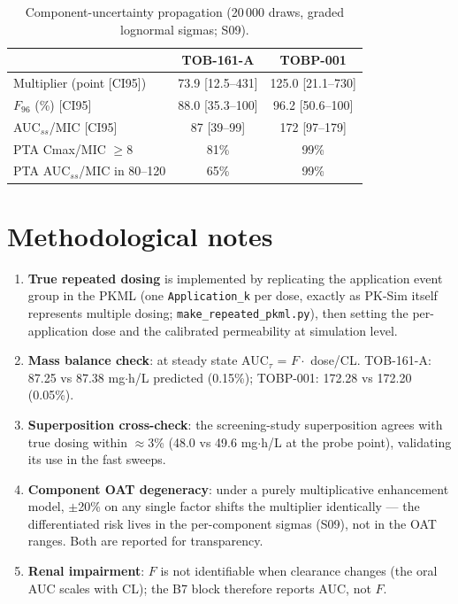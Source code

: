 \begin{table}[htbp]
\centering
\caption{Component-uncertainty propagation (20\,000 draws, graded lognormal sigmas; S09).}
\label{tab:app-s09}
\small
\begin{tabular}{lcc}
\toprule
 & TOB-161-A & TOBP-001 \\
\midrule
Multiplier (point [CI95])   & 73.9 [12.5--431] & 125.0 [21.1--730] \\
$F_{96}$ (\%) [CI95]        & 88.0 [35.3--100] & 96.2 [50.6--100] \\
AUC$_{ss}$/MIC [CI95]       & 87 [39--99]      & 172 [97--179] \\
PTA Cmax/MIC $\geq$8        & 81\%             & 99\% \\
PTA AUC$_{ss}$/MIC in 80--120 & 65\%           & 99\% \\
\bottomrule
\end{tabular}
\end{table}

\section{Methodological notes}
\begin{enumerate}
\item \textbf{True repeated dosing} is implemented by replicating the application event group in the PKML (one \texttt{Application\_k} per dose, exactly as PK-Sim itself represents multiple dosing; \texttt{make\_repeated\_pkml.py}), then setting the per-application dose and the calibrated permeability at simulation level.
\item \textbf{Mass balance check}: at steady state AUC$_{\tau}$ = $F \cdot$ dose/CL. TOB-161-A: 87.25 vs 87.38 mg$\cdot$h/L predicted (0.15\%); TOBP-001: 172.28 vs 172.20 (0.05\%).
\item \textbf{Superposition cross-check}: the screening-study superposition agrees with true dosing within $\approx$3\% (48.0 vs 49.6 mg$\cdot$h/L at the probe point), validating its use in the fast sweeps.
\item \textbf{Component OAT degeneracy}: under a purely multiplicative enhancement model, $\pm$20\% on any single factor shifts the multiplier identically --- the differentiated risk lives in the per-component sigmas (S09), not in the OAT ranges. Both are reported for transparency.
\item \textbf{Renal impairment}: $F$ is not identifiable when clearance changes (the oral AUC scales with CL); the B7 block therefore reports AUC, not $F$.
\end{enumerate}
